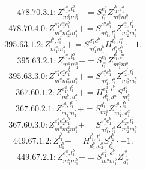 \documentclass[letterpaper,10pt,fleqn,leqno,onecolumn]{article}
\begin{document}
\begin{equation} \;\;\;\;\;\;  478.70.3.1: Z^{e_{1}^{a},l_{1}^{b}}_{m_{1}^{a}m_{1}^{b}}+=S^{e_{1}^{a}}_{l_{1}^{a}}Z^{l_{1}^{b},l_{1}^{a}}_{m_{1}^{a}m_{1}^{b}} \end{equation}
\begin{equation} \;\;\;\;\;\;  478.70.4.0: Z^{e_{1}^{a}e_{2}^{a}e_{1}^{b}}_{m_{1}^{a}m_{2}^{a}m_{1}^{b}}+=S^{e_{1}^{a}e_{1}^{b}}_{m_{1}^{a},l_{1}^{b}}Z^{e_{2}^{a},l_{1}^{b}}_{m_{2}^{a}m_{1}^{b}} \end{equation}
\begin{equation} \;\;\;\;\;\;  395.63.1.2: Z^{l_{1}^{b},l_{1}^{a}}_{m_{1}^{a}m_{1}^{b}}+=S^{d_{1}^{a}d_{1}^{b}}_{m_{1}^{a}m_{1}^{b}}H^{l_{1}^{b},l_{1}^{a}}_{d_{1}^{a}d_{1}^{b}}\cdot -1. \end{equation}
\begin{equation} \;\;\;\;\;\;  395.63.2.1: Z^{e_{1}^{a},l_{1}^{b}}_{m_{1}^{a}m_{1}^{b}}+=S^{e_{1}^{a}}_{l_{1}^{a}}Z^{l_{1}^{b},l_{1}^{a}}_{m_{1}^{a}m_{1}^{b}} \end{equation}
\begin{equation} \;\;\;\;\;\;  395.63.3.0: Z^{e_{1}^{a}e_{2}^{a}e_{1}^{b}}_{m_{1}^{a}m_{2}^{a}m_{1}^{b}}+=S^{e_{1}^{a}e_{1}^{b}}_{m_{1}^{a},l_{1}^{b}}Z^{e_{2}^{a},l_{1}^{b}}_{m_{2}^{a}m_{1}^{b}} \end{equation}
\begin{equation} \;\;\;\;\;\;  367.60.1.2: Z^{e_{1}^{a},l_{1}^{b}}_{m_{1}^{b},d_{1}^{a}}+=H^{e_{1}^{a},l_{1}^{b}}_{d_{1}^{b},d_{1}^{a}}S^{d_{1}^{b}}_{m_{1}^{b}} \end{equation}
\begin{equation} \;\;\;\;\;\;  367.60.2.1: Z^{e_{1}^{a},l_{1}^{b}}_{m_{1}^{a}m_{1}^{b}}+=S^{d_{1}^{a}}_{m_{1}^{a}}Z^{e_{1}^{a},l_{1}^{b}}_{m_{1}^{b},d_{1}^{a}} \end{equation}
\begin{equation} \;\;\;\;\;\;  367.60.3.0: Z^{e_{1}^{a}e_{2}^{a}e_{1}^{b}}_{m_{1}^{a}m_{2}^{a}m_{1}^{b}}+=S^{e_{1}^{a}e_{1}^{b}}_{m_{1}^{a},l_{1}^{b}}Z^{e_{2}^{a},l_{1}^{b}}_{m_{2}^{a}m_{1}^{b}} \end{equation}
\begin{equation} \;\;\;\;\;\;  449.67.1.2: Z^{l_{1}^{b}}_{d_{1}^{b}}+=H^{l_{1}^{b},l_{2}^{b}}_{d_{1}^{b},d_{2}^{b}}S^{d_{2}^{b}}_{l_{2}^{b}}\cdot -1. \end{equation}
\begin{equation} \;\;\;\;\;\;  449.67.2.1: Z^{e_{1}^{a},l_{1}^{b}}_{m_{1}^{a}m_{1}^{b}}+=S^{e_{1}^{a},d_{1}^{b}}_{m_{1}^{a}m_{1}^{b}}Z^{l_{1}^{b}}_{d_{1}^{b}} \end{equation}
\end{document}

